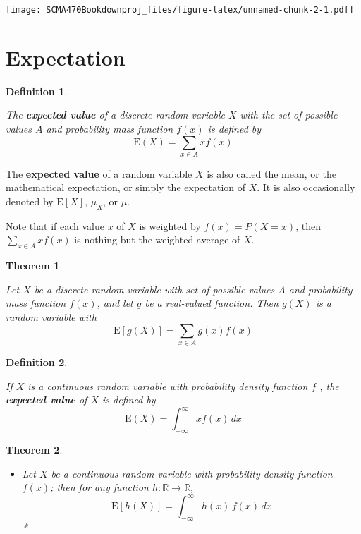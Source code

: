 \documentclass[
]{book}
\providecommand{\tightlist}{%
  \setlength{\itemsep}{0pt}\setlength{\parskip}{0pt}}
\newtheorem{theorem}{Theorem}[chapter]
\theoremstyle{definition}
\newtheorem{definition}{Definition}[chapter]
\theoremstyle{definition}
\theoremstyle{definition}
\theoremstyle{definition}
\theoremstyle{remark}
\begin{document}
\texttt{[image: SCMA470Bookdownproj\_files/figure-latex/unnamed-chunk-2-1.pdf]}

\hypertarget{expectation}{%
\section{Expectation}\label{expectation}}

\begin{definition}
\protect\hypertarget{def:unlabeled-div-5}{}\label{def:unlabeled-div-5}

\emph{The \textbf{expected value} of a discrete random variable
\(X\) with the set of possible values \(A\) and probability mass function
\(f(x)\) is defined by \[\mathrm{E}(X) = \sum_{x \in A} x f(x)\]}

\end{definition}

The \textbf{expected value} of a random variable \(X\) is also called the mean,
or the mathematical expectation, or simply the expectation of \(X\). It is
also occasionally denoted by \(\mathrm{E}[X]\), \(\mu_X\), or \(\mu\).

Note that if each value \(x\) of \(X\) is weighted by \(f(x) = P(X = x)\),
then \(\displaystyle \sum_{x \in A} x f(x)\) is nothing but the weighted
average of \(X\).

\begin{theorem}
\protect\hypertarget{thm:unlabeled-div-6}{}\label{thm:unlabeled-div-6}

\emph{Let \(X\) be a discrete random variable with set of
possible values \(A\) and probability mass function \(f(x)\), and let \(g\) be
a real-valued function. Then \(g(X)\) is a random variable with
\[\mathrm{E}[g(X)] = \sum_{x \in A} g(x) f(x)\] }

\end{theorem}

\begin{definition}
\protect\hypertarget{def:unlabeled-div-7}{}\label{def:unlabeled-div-7}

\emph{If \(X\) is a continuous random variable with
probability density function \(f\) , the \textbf{expected value} of \(X\) is
defined by \[\mathrm{E}(X) = \int_{-\infty}^\infty x f(x)\, dx\] }

\end{definition}

\begin{theorem}
\protect\hypertarget{thm:unlabeled-div-8}{}\label{thm:unlabeled-div-8}

\begin{itemize}
\tightlist
\item
  Let \(X\) be a continuous random variable with
  probability density function \(f (x)\); then for any function
  \(h: \mathbb{R} \rightarrow \mathbb{R}\),
  \[\mathrm{E}[h(X)] = \int_{-\infty}^\infty h(x)\, f(x)\, dx\] *
\end{itemize}

\end{theorem}
\end{document}
